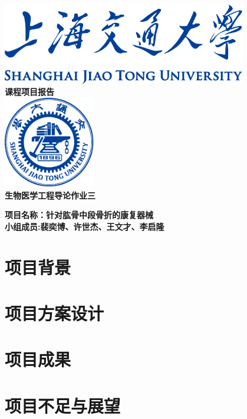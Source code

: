 \documentclass[UTF8]{ctexart}
\begin{document}
\pagestyle{fancy}
\cfoot{\thepage}

\begin{titlepage}
    \begin{center}
        \includegraphics[width=0.8\textwidth]{sjtu-name-blue.pdf}\\[1cm]
        \textsc{\huge \bfseries 课程项目报告}\\[1.5cm]
        \includegraphics[width=0.3\textwidth]{sjtu-badge-blue.pdf}\\[1cm]    
        \textsc{\huge \bfseries 生物医学工程导论作业三}\\[1.5cm]

        \begin{minipage}{0.75\textwidth}
            \begin{flushleft} 
                \LARGE \bfseries{项目名称：针对肱骨中段骨折的康复器械}\\
                \LARGE \bfseries{小组成员:裴奕博、许世杰、王文才、李启隆}
            \end{flushleft}
        \end{minipage}

    \end{center}
\end{titlepage}

\begin{abstract}
\end{abstract}
\newpage

\section{项目背景}
\newpage
    
\section{项目方案设计}
\newpage


\section{项目成果}
\newpage

\section{项目不足与展望}
\newpage
    

    
\end{document}
